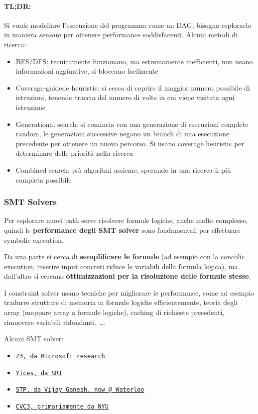 \paragraph{TL;DR:} Si vuole modellare l'esecuzione del programma come un DAG, bisogna esplorarlo in maniera \textit{sensata} per ottenere performance soddisfacenti. Alcuni metodi di ricerca:
\begin{itemize}
    \item BFS/DFS: tecnicamente funzionano, ma estremamente inefficienti, non usano informazioni aggiuntive, si bloccano facilmente
    
    \item Coverage-guidede heuristic: si cerca di coprire il maggior numero possibile di istruzioni, tenendo traccia del numero di volte in cui viene visitata ogni istruzione
    
    \item Generational search: si comincia con una generazione di esecuzioni complete random, le generazioni successive negano un branch di una esecuzione precedente per ottenere un nuovo percorso. Si usano coverage heuristic per determinare delle priorità nella ricerca
    
    \item Combined search: più algoritmi assieme, sperando in una ricerca il più completa possibile
\end{itemize}

\subsubsection{SMT Solvers}

Per esplorare nuovi path serve risolvere formule logiche, anche molto complesse, quindi le \textbf{performance degli SMT solver} sono fondamentali per effettuare symbolic execution.

Da una parte si cerca di \textbf{semplificare le formule} (ad esempio con la concolic execution, inserire input concreti riduce le variabili della formula logica), ma dall'altro si cercano \textbf{ottimizzazioni per la risoluzione delle formule stesse}. 

I constraint solver usano tecniche per migliorare le performance, come ad esempio tradurre strutture di memoria in formule logiche efficientemente, teoria degli array (mappare array a formule logiche), caching di richieste precedenti, rimuovere variabili ridondanti, \dots.

Alcuni SMT solver:
\begin{itemize}
	\item \href{http://z3.codeplex.com/}{\texttt{Z3, da Microsoft research}}

	\item \href{http://yices.csl.sri.com/}{\texttt{Yices, da SRI}}

	\item \href{https://sites.google.com/site/stpfastprover/}{\texttt{STP, da Vijay Ganesh, now @ Waterloo}}

	\item \href{http://www.cs.nyu.edu/acsys/cvc3/}{\texttt{CVC3, primariamente da NYU}}
\end{itemize}

